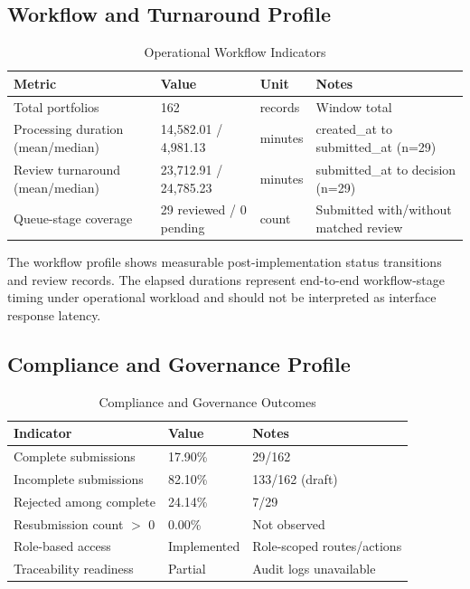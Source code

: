 \documentclass[conference]{IEEEtran}
\begin{document}
\subsection{Workflow and Turnaround Profile}
\begin{table}[htbp]
\caption{Operational Workflow Indicators}
\centering
\begin{tabular}{p{2.35cm}p{2.05cm}p{1.05cm}p{1.55cm}}
\toprule
Metric & Value & Unit & Notes \\
\midrule
Total portfolios & 162 & records & Window total \\
Processing duration (mean/median) & 14,582.01 / 4,981.13 & minutes & created\_at to submitted\_at (n=29) \\
Review turnaround (mean/median) & 23,712.91 / 24,785.23 & minutes & submitted\_at to decision (n=29) \\
Queue-stage coverage & 29 reviewed / 0 pending & count & Submitted with/without matched review \\
\bottomrule
\end{tabular}
\end{table}

The workflow profile shows measurable post-implementation status transitions and review records. The elapsed durations represent end-to-end workflow-stage timing under operational workload and should not be interpreted as interface response latency.

\subsection{Compliance and Governance Profile}
\begin{table}[htbp]
\caption{Compliance and Governance Outcomes}
\centering
\begin{tabular}{p{2.65cm}p{1.45cm}p{2.35cm}}
\toprule
Indicator & Value & Notes \\
\midrule
Complete submissions & 17.90\% & 29/162 \\
Incomplete submissions & 82.10\% & 133/162 (draft) \\
Rejected among complete & 24.14\% & 7/29 \\
Resubmission count $>$ 0 & 0.00\% & Not observed \\
Role-based access & Implemented & Role-scoped routes/actions \\
Traceability readiness & Partial & Audit logs unavailable \\
\bottomrule
\end{tabular}
\end{table}
\end{document}
